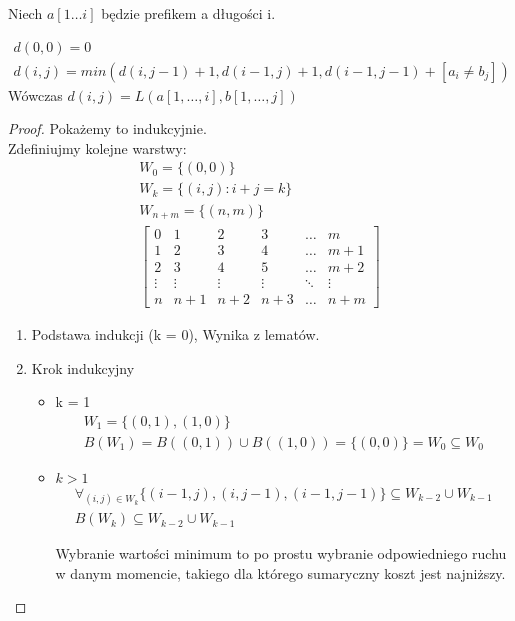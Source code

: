 \documentclass[paper=a4, fontsize=11pt]{article}
\begin{document}
\begin{mydef}[Prefiks]
Niech $a[1 \dots i]$ będzie prefikem a długości i.
\end{mydef}
\begin{theorem} 
\begin{gather*}
d(0,0) = 0 \\
d(i, j) = min(d(i, j-1) + 1 , d(i-1, j) + 1, d(i-1, j-1) + [a_i \neq b_j])
\end{gather*}
Wówczas $d(i, j) = L(a[1, \dots, i], b[1, \dots, j])$
\end{theorem}
\begin{proof} Pokażemy to indukcyjnie. \\
Zdefiniujmy kolejne warstwy:
\begin{gather*}
W_0 = \{(0, 0)\} \\
W_k = \{(i, j) : i + j = k \} \\
W_{n+m} = \{(n, m)\} \\
\begin{bmatrix}
0 & 1 & 2 & 3 & \dots & m \\
1 & 2 & 3 & 4 & \dots & m + 1 \\
2 & 3 & 4 & 5 & \dots & m + 2\\
\vdots & \vdots & \vdots & \vdots & \ddots & \vdots \\
n & n+1 & n+2 & n+3 & \dots & n+m
\end{bmatrix}
\end{gather*}
\begin{enumerate}
\item Podstawa indukcji (k = 0), Wynika z lematów.
\item Krok indukcyjny
\begin{itemize}
\item k = 1 \\
\begin{gather}
W_1 = \{(0, 1), (1, 0)\} \\
B({W_1}) = B((0,1)) \cup B((1,0)) = \{(0,0) \} = W_0 \subseteq W_0
\end{gather}
\item $k > 1$ \\
\begin{gather*}
\forall_{(i, j) \in W_k} \{(i-1, j), (i, j-1), (i-1, j-1)\} \subseteq W_{k-2} \cup W_{k-1} \\
B(W_k) \subseteq W_{k-2}  \cup W_{k-1}
\end{gather*}

Wybranie wartości minimum to po prostu wybranie odpowiedniego ruchu w danym momencie, takiego dla którego sumaryczny koszt jest najniższy.
\end{itemize}

\end{enumerate}

\end{proof}
\end{document}
